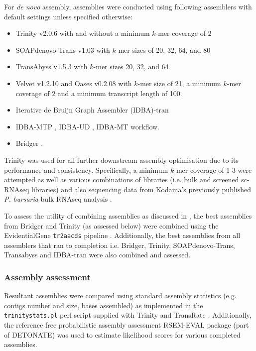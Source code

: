 For \textit{de novo} assembly, assemblies were conducted using following 
assemblers with default settings unless specified otherwise:
\begin{itemize}
    \item Trinity v2.0.6 \citep{Grabherr2011} with and without a minimum \(k\)-mer coverage of 2
    \item SOAPdenovo-Trans v1.03 \citep{Xie2014} with \(k\)-mer sizes of 20, 32, 64, and 80   
    \item TransAbyss v1.5.3 \citep{Robertson2010} with \(k\)-mer sizes 20, 32, and 64 
    \item Velvet v1.2.10 \citep{Zerbino2008} and Oases v0.2.08 \citep{Schulz2012} with \(k\)-mer size of 
        21, a minimum \(k\)-mer coverage of 2 and a minimum transcript length
        of 100.
    \item Iterative de Bruijn Graph Assembler (IDBA)-tran \citep{Peng2010,Peng2012,Peng2013} 
    \item IDBA-MTP \citep{Leung2014}, IDBA-UD \citep{Peng2012}, IDBA-MT \citep{Leung2013} workflow.
    \item Bridger \citep{Chang2015}.
\end{itemize}

Trinity was used for all further downstream assembly optimisation due to its performance
and consistency.
Specifically, a minimum \(k\)-mer coverage of 1-3 were attempted as well as various
combinations of libraries (i.e. bulk and screened sc-RNAseq libraries) and also
sequencing data from Kodama's previously published \textit{P. bursaria} bulk
RNAseq analysis \citep{Kodama2014c}.


To assess the utility of combining assemblies as discussed in \citep{Nakasugi2014}, 
the best assemblies from Bridger and Trinity
(as assessed below) were combined using the EvidentialGene \texttt{tr2aacds} pipeline \citep{Gilbert2013}.
Additionally, the best assemblies from all assemblers that ran to completion i.e.
Bridger, Trinity, SOAPdenovo-Trans, Transabyss and IDBA-tran were also combined and 
assessed. 

\subsubsection{Assembly assessment}
\label{sec:assembly_assessment}

Resultant assemblies were compared using standard assembly statistics 
(e.g. contigs number and size, bases assembled) as implemented in the \texttt{trinitystats.pl} perl script supplied with 
Trinity \citep{Haas2013} and TransRate \citep{Smith-unna2015}. 
Additionally, the reference free probabilistic assembly assessment RSEM-EVAL package (part of DETONATE) \citep{Li2014} was used to
estimate likelihood scores for various completed assemblies.

